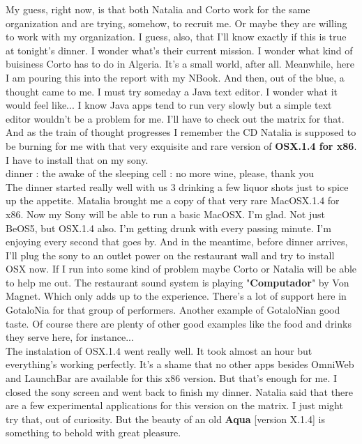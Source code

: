 \documentclass[11pt,twoside,a4paper]{book}
\begin{document}
\begin{multicols*}{2}
\vfill
\columnbreak

    My guess, right now, is that both Natalia and Corto work for the same organization and are trying, somehow, to recruit me. Or maybe they are willing to work with my organization. I guess, also, that I'll know exactly if this is true at tonight's dinner. I wonder what's their current mission. I wonder what kind of buisiness Corto has to do in Algeria. It's a small world, after all. Meanwhile, here I am pouring this into the report with my NBook. And then, out of the blue, a thought came to me. I must try someday a Java text editor. I wonder what it would feel like... I know Java apps tend to run very slowly but a simple text editor wouldn't be a problem for me. I'll have to check out the matrix for that. And as the train of thought progresses I remember the CD Natalia is supposed to be burning for me with that very exquisite and rare version of \textbf{OSX.1.4 for x86}. I have to install that on my sony. ~\\

    {\small dinner : the awake of the sleeping cell : no more wine, please, thank you} ~\\

    The dinner started really well with us 3 drinking a few liquor shots just to spice up the appetite. Matalia brought me a copy of that very rare MacOSX.1.4 for x86. Now my Sony will be able to run a basic MacOSX. I'm glad. Not just BeOS5, but OSX.1.4 also. I'm getting drunk with every passing minute. I'm enjoying every second that goes by. And in the meantime, before dinner arrives, I'll plug the sony to an outlet power on the restaurant wall and try to install OSX now. If I run into some kind of problem maybe Corto or Natalia will be able to help me out. The restaurant sound system is playing "\textbf{Computador}" by Von Magnet. Which only adds up to the experience. There's a lot of support here in GotaloNia for that group of performers. Another example of GotaloNian good taste. Of course there are plenty of other good examples like the food and drinks they serve here, for instance... ~\\

    The instalation of OSX.1.4 went really well. It took almost an hour but everything's working perfectly. It's a shame that no other apps besides OmniWeb and LaunchBar are available for this x86 version. But that's enough for me. I closed the sony screen and went back to finish my dinner. Natalia said that there are a few experimental applications for this version on the matrix. I just might try that, out of curiosity. But the beauty of an old \textbf{Aqua} [version X.1.4] is something to behold with great pleasure. ~\\


\end{multicols*}
\end{document}
